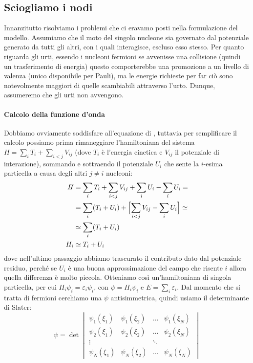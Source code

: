 \subsection{Sciogliamo i nodi} 
Innanzitutto risolviamo i problemi che ci eravamo posti nella formulazione del modello.
Assumiamo che il moto del singolo nucleone sia governato dal potenziale generato da tutti gli altri, con i quali interagisce, escluso esso stesso. Per quanto riguarda gli urti, essendo i nucleoni fermioni se avvenisse una collisione (quindi un trasferimento di energia) questo comporterebbe una promozione a un livello di valenza (unico disponibile per Pauli), ma le energie richieste per far ciò sono notevolmente maggiori di quelle scambiabili attraverso l'urto. Dunque, assumeremo che gli urti non avvengono.\\[-1.3cm]
\paragraph{Calcolo della funzione d'onda} Dobbiamo ovviamente soddisfare all'equazione di \Sch, tuttavia per semplificare il calcolo possiamo prima rimaneggiare l'hamiltoniana del sistema $H=\sum_i T_i + \sum_{i<j}V_{ij}$ (dove $T_i$ è l'energia cinetica e $V_{ij}$ il potenziale di interazione), sommando e sottraendo il potenziale $U_i$ che sente la $i$-esima particella a causa degli altri $j\not =i$ nucleoni:
\begin{displaymath}
\begin{aligned}
H&=\sum_i T_i + \sum_{i<j}V_{ij} +\sum_i U_i - \sum_i U_i=\\
&= \sum_i (T_i + U_i) + \Bigl [ \sum_{i<j} V_{ij} - \sum_i U_i \Bigr ] \simeq\\
&\simeq \sum_i (T_i + U_i)\\
H_i &\simeq T_i + U_i
\end{aligned}
\end{displaymath}
dove nell'ultimo passaggio abbiamo trascurato il contributo dato dal potenziale residuo, perché se $U_i$ è una buona approssimazione del campo che risente $i$ allora quella differenza è molto piccola. Otteniamo così un'hamiltoniana di singola particella, per cui $H_i \psi_i = \varepsilon_i \psi_i$, con $\psi = \Pi_i \psi_i$ e $E = \sum_i \varepsilon_i$. Dal momento che si tratta di fermioni cerchiamo una $\psi$ antisimmetrica, quindi usiamo il determinante di Slater:
\begin{displaymath}
\psi = \det
\begin{vmatrix}
\psi_1 (\xi_1) & \psi_1 (\xi_2) & \dots & \psi_1 (\xi_N) \\
\psi_2 (\xi_1) & \psi_2 (\xi_2) & \dots & \psi_2 (\xi_N) \\
\vdots         &                & \ddots&                \\
\psi_N (\xi_1) & \psi_N (\xi_2) & \dots & \psi_N (\xi_N)
\end{vmatrix}
\end{displaymath}
